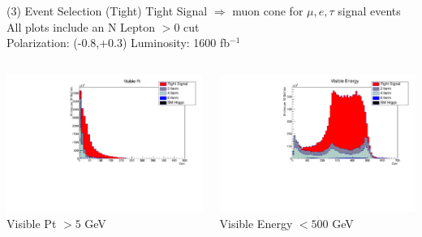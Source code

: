 \documentclass[10pt]{beamer}
\begin{document}
\begin{frame}{(3) Event Selection (Tight)}
\scriptsize
Tight Signal $\Rightarrow$  muon cone for $\mu,e,\tau$ signal events\\
All plots include an N Lepton $> 0$ cut\\
Polarization: (-0.8,+0.3)\quad
Luminosity: 1600 fb$^{-1}$
\begin{columns}
\begin{column}{0.5\textwidth}
\includegraphics[scale=0.3, left]{PtvisHist.pdf} \\
Visible Pt $> 5$ GeV
\end{column}
\begin{column}{0.5\textwidth}
\includegraphics[scale=0.3, left]{EvisHist.pdf} \\
Visible Energy $< 500$ GeV
\end{column}
\end{columns}
\end{frame}
\end{document}
